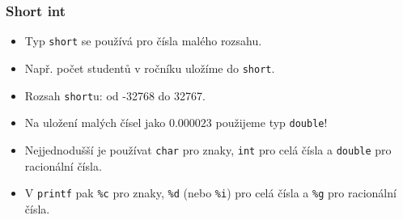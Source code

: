 \documentclass{beamer}
\newenvironment{itemizex}%
  {\large \begin{itemize}%
    \setlength{\itemsep}{8pt}%
    \setlength{\parskip}{8pt}}%
  {\end{itemize}}
\begin{document}
\begin{frame}[t,fragile]\frametitle{Short int} 
  \begin{itemizex}
    \item Typ \texttt{short} se používá pro čísla malého rozsahu.
    \item Např. počet studentů v ročníku uložíme do \texttt{short}.
    \item Rozsah \texttt{short}u: od -32768 do 32767.
    \item Na uložení malých čísel jako $0.000023$ použijeme typ \texttt{double}!
    \item Nejjednodušší je používat \texttt{char} pro znaky, \texttt{int} pro celá čísla a \texttt{double} pro racionální čísla.
    \item V \texttt{printf} pak \texttt{\%c} pro znaky, \texttt{\%d} (nebo \texttt{\%i}) pro celá čísla a \texttt{\%g} pro racionální čísla.
  \end{itemizex}
\end{frame}
\end{document}
